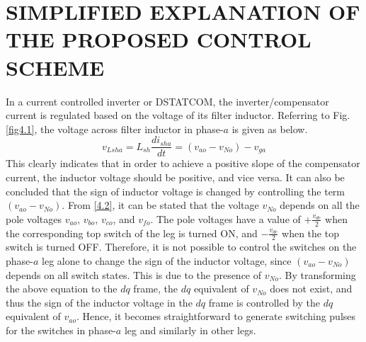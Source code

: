 \chapter{SIMPLIFIED EXPLANATION OF THE PROPOSED CONTROL SCHEME}
In a current controlled inverter or DSTATCOM, the inverter/compensator current is regulated based on the voltage of its filter inductor. Referring to Fig.\,\ref{fig4.1}, the voltage across filter inductor in phase-$a$ is given as below.
\begin{equation}
v_{Lsha} = L_{sh}\frac{di_{sha}}{dt} = (v_{ao} - v_{No}) - v_{ga}
\end{equation}
This clearly indicates that in order to achieve a positive slope of the compensator current, the inductor voltage should be positive, and vice versa. It can also be concluded that the sign of inductor voltage is changed by controlling the term $(v_{ao} - v_{No})$. From \eqref{4.2}, it can be stated that the voltage $v_{No}$ depends on all the pole voltages $v_{ao}, \, v_{bo}, \, v_{co}$, and $v_{fo}$. The pole voltages have a value of $+\frac{v_{dc}}{2}$ when the corresponding top switch of the leg is turned ON, and $-\frac{v_{dc}}{2}$ when the top switch is turned OFF. Therefore, it is not possible to control the switches on the phase-$a$ leg alone to change the sign of the inductor voltage, since $(v_{ao} - v_{No})$ depends on all switch states. This is due to the presence of $v_{No}$. By transforming the above equation to the $dq$ frame, the $dq$ equivalent of $v_{No}$ does not exist, and thus the sign of the inductor voltage in the $dq$ frame is controlled by the $dq$ equivalent of $v_{ao}$. Hence, it becomes straightforward to generate switching pulses for the switches in phase-$a$ leg and similarly in other legs. 

